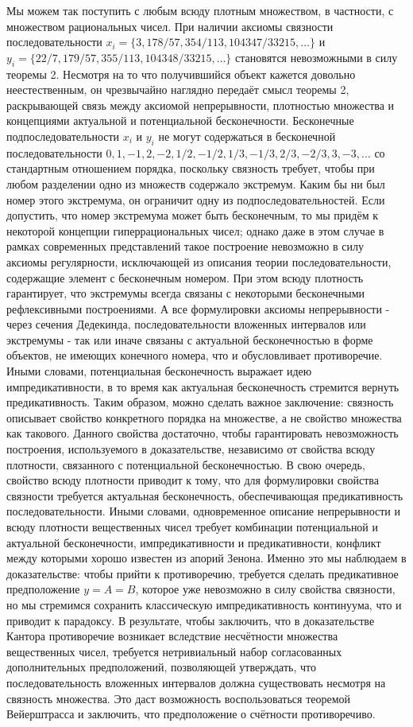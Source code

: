 \documentclass[12pt]{article}
\begin{document}
Мы можем так поступить с любым всюду плотным множеством, в частности, с множеством рациональных чисел. При наличии аксиомы связности последовательности $x_i = \{3, 178/57, 354/113, 104347/33215, \dots \}$ и $y_i = \{22/7, 179/57, 355/113, 104348/33215, \dots \}$ становятся невозможными в силу теоремы 2. Несмотря на то что получившийся объект кажется довольно неестественным, он чрезвычайно наглядно передаёт смысл теоремы 2, раскрывающей связь между аксиомой непрерывности, плотностью множества и концепциями актуальной и потенциальной бесконечности. Бесконечные подпоследовательности $x_i$ и $y_i$ не могут содержаться в бесконечной последовательности $0, 1, -1, 2, -2, 1/2, -1/2, 1/3, -1/3, 2/3, -2/3, 3, -3, \dots$ со стандартным отношением порядка, поскольку связность требует, чтобы при любом разделении одно из множеств содержало экстремум. Каким бы ни был номер этого экстремума, он ограничит одну из подпоследовательностей. Если допустить, что номер экстремума может быть бесконечным, то мы придём к некоторой концепции гиперрациональных чисел; однако даже в этом случае в рамках современных представлений такое построение невозможно в силу аксиомы регулярности, исключающей из описания теории последовательности, содержащие элемент с бесконечным номером. При этом всюду плотность гарантирует, что экстремумы всегда связаны с некоторыми бесконечными рефлексивными построениями. А все формулировки аксиомы непрерывности - через сечения Дедекинда, последовательности вложенных интервалов или экстремумы - так или иначе связаны с актуальной бесконечностью в форме объектов, не имеющих конечного номера, что и обусловливает противоречие. Иными словами, потенциальная бесконечность выражает идею импредикативности, в то время как актуальная бесконечность стремится вернуть предикативность. Таким образом, можно сделать важное заключение: связность описывает свойство конкретного порядка на множестве, а не свойство множества как такового. Данного свойства достаточно, чтобы гарантировать невозможность построения, используемого в доказательстве, независимо от свойства всюду плотности, связанного с потенциальной бесконечностью. В свою очередь, свойство всюду плотности приводит к тому, что для формулировки свойства связности требуется актуальная бесконечность, обеспечивающая предикативность последовательности. Иными словами, одновременное описание непрерывности и всюду плотности вещественных чисел требует комбинации потенциальной и актуальной бесконечности, импредикативности и предикативности, конфликт между которыми хорошо известен из апорий Зенона. Именно это мы наблюдаем в доказательстве: чтобы прийти к противоречию, требуется сделать предикативное предположение $y = A = B$, которое уже невозможно в силу свойства связности, но мы стремимся сохранить классическую импредикативность континуума, что и приводит к парадоксу. В результате, чтобы заключить, что в доказательстве Кантора противоречие возникает вследствие несчётности множества вещественных чисел, требуется нетривиальный набор согласованных дополнительных предположений, позволяющей утверждать, что последовательность вложенных интервалов должна существовать несмотря на связность множества. Это даст возможность воспользоваться теоремой Вейерштрасса и заключить, что предположение о счётности противоречиво.
\end{document}
